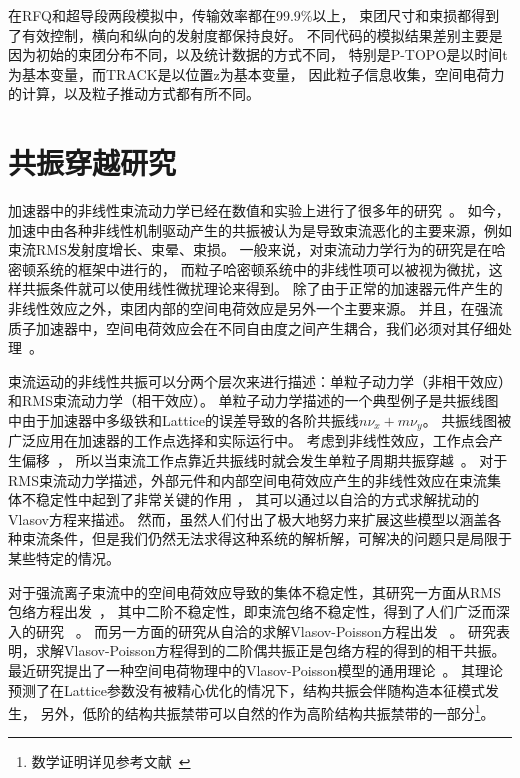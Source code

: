 在RFQ和超导段两段模拟中，传输效率都在99.9\%以上，
束团尺寸和束损都得到了有效控制，横向和纵向的发射度都保持良好。
不同代码的模拟结果差别主要是因为初始的束团分布不同，以及统计数据的方式不同，
特别是P-TOPO是以时间t为基本变量，而TRACK是以位置z为基本变量，
因此粒子信息收集，空间电荷力的计算，以及粒子推动方式都有所不同。

\section{共振穿越研究}            \label{section:Resonance_crossing}
加速器中的非线性束流动力学已经在数值和实验上进行了很多年的研究~\cite{accelerator2004lee,reiser2008theory}。
如今，加速中由各种非线性机制驱动产生的共振被认为是导致束流恶化的主要来源，例如束流RMS发射度增长、束晕、束损。
一般来说，对束流动力学行为的研究是在哈密顿系统的框架中进行的，
而粒子哈密顿系统中的非线性项可以被视为微扰，这样共振条件就可以使用线性微扰理论来得到。
除了由于正常的加速器元件产生的非线性效应之外，束团内部的空间电荷效应是另外一个主要来源。
并且，在强流质子加速器中，空间电荷效应会在不同自由度之间产生耦合，我们必须对其仔细处理~\cite{accelerator2013chao}。

束流运动的非线性共振可以分两个层次来进行描述：单粒子动力学（非相干效应）和RMS束流动力学（相干效应）。
单粒子动力学描述的一个典型例子是共振线图中由于加速器中多级铁和Lattice的误差导致的各阶共振线$n\nu_x+m\nu_y$。
共振线图被广泛应用在加速器的工作点选择和实际运行中。
考虑到非线性效应，工作点会产生偏移~\cite{fedotov2001space}，
所以当束流工作点靠近共振线时就会发生单粒子周期共振穿越~\cite{franchetti2006particle}。
对于RMS束流动力学描述，外部元件和内部空间电荷效应产生的非线性效应在束流集体不稳定性中起到了非常关键的作用
\cite{sacherer1968transverse, sacherer1973longitudinal}，
其可以通过以自洽的方式求解扰动的Vlasov方程来描述\cite{chao1993physics,gluckstern1970oscillation,gluckstern1970stability}。
然而，虽然人们付出了极大地努力来扩展这些模型以涵盖各种束流条件，但是我们仍然无法求得这种系统的解析解，可解决的问题只是局限于某些特定的情况。

对于强流离子束流中的空间电荷效应导致的集体不稳定性，其研究一方面从RMS包络方程出发~\cite{sacherer1971rms}，
其中二阶不稳定性，即束流包络不稳定性，得到了人们广泛而深入的研究 ~\cite{14,15,16,17,21,22}。
而另一方面的研究从自洽的求解Vlasov-Poisson方程出发 ~\cite{11,12,18,19}。
研究表明，求解Vlasov-Poisson方程得到的二阶偶共振正是包络方程的得到的相干共振。
最近研究提出了一种空间电荷物理中的Vlasov-Poisson模型的通用理论~\cite{11, 12}。
其理论预测了在Lattice参数没有被精心优化的情况下，结构共振会伴随构造本征模式发生，
另外，低阶的结构共振禁带可以自然的作为高阶结构共振禁带的一部分\footnote{数学证明详见参考文献~\cite{12}}。

